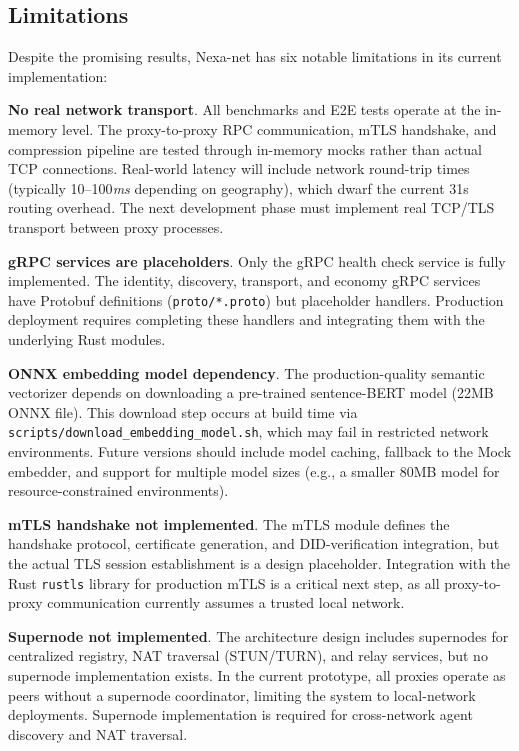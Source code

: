 \subsection{Limitations}

Despite the promising results, Nexa-net has six notable limitations in its current implementation:

\textbf{No real network transport}. All benchmarks and E2E tests operate at the in-memory level. The proxy-to-proxy RPC communication, mTLS handshake, and compression pipeline are tested through in-memory mocks rather than actual TCP connections. Real-world latency will include network round-trip times (typically 10--100\textit{ms} depending on geography), which dwarf the current 31\textmu s routing overhead. The next development phase must implement real TCP/TLS transport between proxy processes.

\textbf{gRPC services are placeholders}. Only the gRPC health check service is fully implemented. The identity, discovery, transport, and economy gRPC services have Protobuf definitions (\texttt{proto/*.proto}) but placeholder handlers. Production deployment requires completing these handlers and integrating them with the underlying Rust modules.

\textbf{ONNX embedding model dependency}. The production-quality semantic vectorizer depends on downloading a pre-trained sentence-BERT model (22MB ONNX file). This download step occurs at build time via \texttt{scripts/download\_embedding\_model.sh}, which may fail in restricted network environments. Future versions should include model caching, fallback to the Mock embedder, and support for multiple model sizes (e.g., a smaller 80MB model for resource-constrained environments).

\textbf{mTLS handshake not implemented}. The mTLS module defines the handshake protocol, certificate generation, and DID-verification integration, but the actual TLS session establishment is a design placeholder. Integration with the Rust \texttt{rustls} library for production mTLS is a critical next step, as all proxy-to-proxy communication currently assumes a trusted local network.

\textbf{Supernode not implemented}. The architecture design includes supernodes for centralized registry, NAT traversal (STUN/TURN), and relay services, but no supernode implementation exists. In the current prototype, all proxies operate as peers without a supernode coordinator, limiting the system to local-network deployments. Supernode implementation is required for cross-network agent discovery and NAT traversal.

